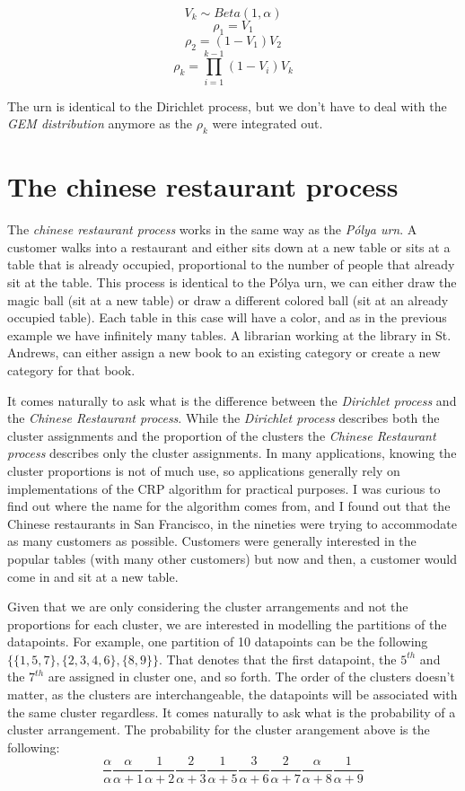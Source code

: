 \documentclass[12pt,a4paper]{article}
\begin{document}
$$ V_{k} \sim Beta(1, \alpha) $$
$$\rho_{1} = V_{1}$$
$$\rho_{2} = (1 - V_{1})V_{2}$$
$$\rho_{k} = \prod_{i=1}^{k-1}(1-V_{i})V_{k}$$

The urn is identical to the Dirichlet process, but we don't have to deal with the \textit{GEM distribution} anymore as the $\rho_{k}$ were integrated out.

\section{The chinese restaurant process}
The \textit{chinese restaurant process} works in the same way as the \textit{Pólya urn}. A customer walks into a restaurant and either sits down at a new table or sits at a table that is already occupied, proportional to the number of people that already sit at the table. This process is identical to the Pólya urn, we can either draw the magic ball (sit at a new table) or draw a different colored ball (sit at an already occupied table). Each table in this case will have a color, and as in the previous example we have infinitely many tables. A librarian working at the library in St. Andrews, can either assign a new book to an existing category or create a new category for that book. 

It comes naturally to ask what is the difference between the \textit{Dirichlet process} and the \textit{Chinese Restaurant process}. While the \textit{Dirichlet process} describes both the cluster assignments and the proportion of the clusters the \textit{Chinese Restaurant process} describes only the cluster assignments. In many applications, knowing the cluster proportions is not of much use, so applications generally rely on implementations of the CRP algorithm for practical purposes. I was curious to find out where the name for the algorithm comes from, and I found out that the Chinese restaurants in San Francisco, in the nineties were trying to accommodate as many customers as possible. Customers were generally interested in the popular tables (with many other customers) but now and then, a customer would come in and sit at a new table. 

Given that we are only considering the cluster arrangements and not the proportions for each cluster, we are interested in modelling the partitions of the datapoints. For example, one partition of 10 datapoints can be the following $\{\{1, 5, 7\}, \{2,3,4,6\}, \{8, 9\}\}$. That denotes that the first datapoint, the $5^{th}$ and the $7^{th}$ are assigned in cluster one, and so forth. The order of the clusters doesn't matter, as the clusters are interchangeable, the datapoints will be associated with the same cluster regardless. It comes naturally to ask what is the probability of a cluster arrangement. The probability for the cluster arangement above is the following: $$\frac{\alpha}{\alpha}\frac{\alpha}{\alpha+1}\frac{1}{\alpha+2}\frac{2}{\alpha+3}\frac{1}{\alpha+5}\frac{3}{\alpha+6}\frac{2}{\alpha+7}\frac{\alpha}{\alpha+8}\frac{1}{\alpha+9}$$
\end{document}
